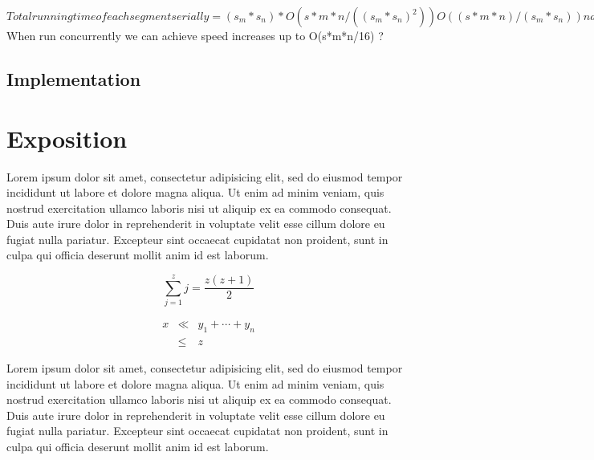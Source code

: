 \documentclass[conference]{acmsiggraph}
\begin{document}
{$Total running time of each segment serially = (s_m*s_n) * O( s*m*n / ((s_m*s_n)^2) ) 
O( (s*m*n)/(s_m*s_n) ) naive example: 4 * O (s*m*n/16) = O(s*m*n/4) - when run serially$
When run concurrently we can achieve speed increases up to O(s*m*n/16) ?



\subsection{Implementation}





\section{Exposition}

Lorem ipsum dolor sit amet, consectetur adipisicing elit, sed do
eiusmod tempor incididunt ut labore et dolore magna aliqua. Ut enim ad
minim veniam, quis nostrud exercitation ullamco laboris nisi ut
aliquip ex ea commodo consequat. Duis aute irure dolor in
reprehenderit in voluptate velit esse cillum dolore eu fugiat nulla
pariatur. Excepteur sint occaecat cupidatat non proident, sunt in
culpa qui officia deserunt mollit anim id est laborum.

\begin{equation}
 \sum_{j=1}^{z} j = \frac{z(z+1)}{2}
\end{equation}

\begin{eqnarray}
x & \ll & y_{1} + \cdots + y_{n} \\
  & \leq & z
\end{eqnarray}

Lorem ipsum dolor sit amet, consectetur adipisicing elit, sed do
eiusmod tempor incididunt ut labore et dolore magna aliqua. Ut enim ad
minim veniam, quis nostrud exercitation ullamco laboris nisi ut
aliquip ex ea commodo consequat. Duis aute irure dolor in
reprehenderit in voluptate velit esse cillum dolore eu fugiat nulla
pariatur. Excepteur sint occaecat cupidatat non proident, sunt in
culpa qui officia deserunt mollit anim id est laborum.


}
\end{document}
